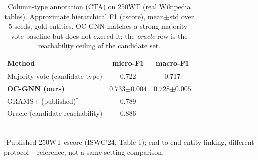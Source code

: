 \begin{table}[t]
\centering
\caption{Column-type annotation (CTA) on 250WT (real Wikipedia tables).
Approximate hierarchical F1 (cscore), mean$\pm$std over 5 seeds, gold entities.
OC-GNN matches a strong majority-vote baseline but does not exceed it; the
\emph{oracle} row is the reachability ceiling of the candidate set.}
\label{tab:cta-250wt}
\begin{tabular}{lcc}
\toprule
Method & micro-F1 & macro-F1 \\
\midrule
Majority vote (candidate type) & 0.722 & 0.717 \\
\textbf{OC-GNN (ours)} & $0.733{\scriptstyle\pm0.004}$ & $0.728{\scriptstyle\pm0.005}$ \\
\midrule
GRAMS+ (published)$^{\dagger}$ & 0.789 & -- \\
Oracle (candidate reachability) & 0.886 & -- \\
\bottomrule
\end{tabular}
\\[2pt]
{\footnotesize $^{\dagger}$Published 250WT cscore (ISWC'24, Table 1); end-to-end
entity linking, different protocol -- reference, not a same-setting comparison.}
\end{table}
